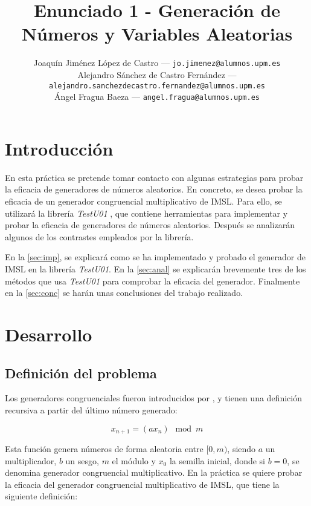 \documentclass{article}
\title{Enunciado 1 - Generación de Números y Variables Aleatorias} %
\author{
        \normalsize Joaquín Jiménez López de Castro --- \small\texttt{jo.jimenez@alumnos.upm.es}\\
        \normalsize Alejandro Sánchez de Castro Fernández --- \small\texttt{alejandro.sanchezdecastro.fernandez@alumnos.upm.es}\\
        \normalsize Ángel Fragua Baeza --- \small\texttt{angel.fragua@alumnos.upm.es}
}
\begin{document}
\maketitle

\thispagestyle{empty}

\newpage


\section{Introducción}

En esta práctica se pretende tomar contacto con algunas estrategias para probar la eficacia de generadores de números aleatorios. En concreto, se desea probar la eficacia de un generador congruencial multiplicativo de IMSL. Para ello, se utilizará la librería \emph{TestU01} \citep{Simard2013ASL}, que contiene herramientas para implementar y probar la eficacia de generadores de números aleatorios. Después se analizarán algunos de los contrastes empleados por la librería.

En la \autoref{sec:imp}, se explicará como se ha implementado y probado el generador de IMSL en la librería \emph{TestU01}. En la \autoref{sec:anal} se explicarán brevemente tres de los métodos que usa \emph{TestU01} para comprobar la eficacia del generador. Finalmente en la \autoref{sec:conc} se harán unas conclusiones del trabajo realizado.

\section{Desarrollo}
\label{sec:imp}

\subsection{Definición del problema}

Los generadores congruenciales fueron introducidos por \citet{Lehm51}, y tienen una definición recursiva a partir del último número generado:

\begin{equation*}
    x_{n+1} = (ax_n) \mod m
\end{equation*}

Esta función genera números de forma aleatoria entre $[0,m)$, siendo $a$ un multiplicador, $b$ un sesgo, $m$ el módulo y $x_0$ la semilla inicial, donde si $b=0$, se denomina generador congruencial multiplicativo. En la práctica se quiere probar la eficacia del generador congruencial multiplicativo de IMSL, que tiene la siguiente definición:
\end{document}
